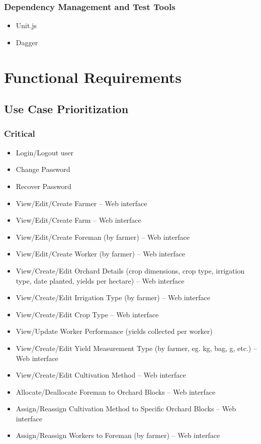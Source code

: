 \documentclass[11pt,fleqn]{book} %
\begin{document}
		\subsection{Dependency Management and Test Tools}
			\begin{itemize}
				\item Unit.js
				\item Dagger
			\end{itemize}



\chapter{Functional Requirements}

	\section{Use Case Prioritization}
		\subsection{Critical}
			\begin{itemize}
				\item Login/Logout user
				\item Change Password
				\item Recover Password
				\item View/Edit/Create Farmer – Web interface
				\item View/Edit/Create Farm – Web interface
				\item View/Edit/Create Foreman (by farmer) – Web interface
				\item View/Edit/Create Worker (by farmer) – Web interface
				\item View/Create/Edit Orchard Details (crop dimensions, crop type, irrigation type, date planted, yields per hectare) – Web interface
				\item View/Create/Edit Irrigation Type (by farmer) – Web interface
				\item View/Create/Edit Crop Type – Web interface
				\item View/Update Worker Performance (yields collected per worker)
				\item View/Create/Edit Yield Measurement Type (by farmer, eg. kg, bag, g, etc.) – Web interface
				\item View/Create/Edit Cultivation Method – Web interface
				\item Allocate/Deallocate Foreman to Orchard Blocks – Web interface
				\item Assign/Reassign Cultivation Method to Specific Orchard Blocks – Web interface
				\item Assign/Reassign Workers to Foreman (by farmer) – Web interface
				
			\end{itemize}
		
\end{document}
